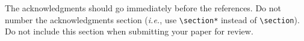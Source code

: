 \documentclass[11pt,a4paper]{article}
\begin{document}
The acknowledgments should go immediately before the references.  Do not number the acknowledgments section ({\em i.e.}, use \verb|\section*| instead of \verb|\section|). Do not include this section when submitting your paper for review.

%
%


\end{document}
